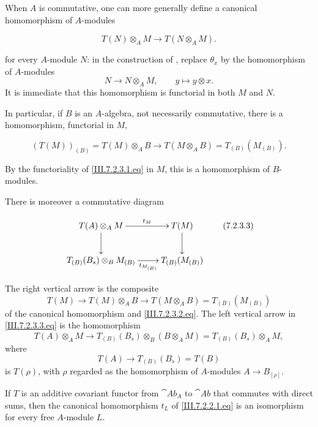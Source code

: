 \begin{env}[7.2.3]
\label{III.7.2.3}
When $A$ is commutative, one can more generally define a
canonical homomorphism of $A$-modules
\begin{env}[7.2.3.1]
\label{III.7.2.3.1}
\[
  T(N)\otimes_A M
  \longrightarrow
  T(N\otimes_A M).
  \tag{7.2.3.1}\label{III.7.2.3.1.eq}
\]
\end{env}
for every $A$-module $N$: in the construction of
, replace $\theta_x$ by the homomorphism of
$A$-modules
\[
  N\longrightarrow N\otimes_A M,
  \qquad
  y\longmapsto y\otimes x.
\]
It is immediate that this homomorphism is functorial in both
$M$ and $N$.

In particular, if $B$ is an $A$-algebra, not necessarily
commutative, there is a homomorphism, functorial in $M$,
\begin{env}[7.2.3.2]
\label{III.7.2.3.2}
\[
  (T(M))_{(B)}
  =
  T(M)\otimes_A B
  \longrightarrow
  T(M\otimes_A B)
  =
  T_{(B)}(M_{(B)}).
  \tag{7.2.3.2}\label{III.7.2.3.2.eq}
\]
\end{env}
By the functoriality of \eqref{III.7.2.3.1.eq} in $M$, this is
a homomorphism of $B$-modules.

There is moreover a commutative diagram
\begin{env}[7.2.3.3]
\label{III.7.2.3.3}
\[
\xymatrix{
  T(A)\otimes_A M
    \ar[r]^-{t_M}\ar[d]
  & T(M)\ar[d]
  \\
  T_{(B)}(B_s)\otimes_B M_{(B)}
    \ar[r]_-{t_{M_{(B)}}}
  & T_{(B)}(M_{(B)})
}
\tag{7.2.3.3}\label{III.7.2.3.3.eq}
\]
\end{env}
The right vertical arrow is the composite
\[
  T(M)
  \longrightarrow
  T(M)\otimes_A B
  \longrightarrow
  T(M\otimes_A B)
  =
  T_{(B)}(M_{(B)})
\]
of the canonical homomorphism and
\eqref{III.7.2.3.2.eq}.  The left vertical arrow in
\eqref{III.7.2.3.3.eq} is the homomorphism
\[
  T(A)\otimes_A M
  \longrightarrow
  T_{(B)}(B_s)\otimes_B(B\otimes_A M)
  =
  T_{(B)}(B_s)\otimes_A M,
\]
where
\[
  T(A)\longrightarrow T_{(B)}(B_s)=T(B)
\]
is $T(\rho)$, with $\rho$ regarded as the homomorphism of
$A$-modules $A\to B_{[\rho]}$.
\end{env}

\begin{lemma}[7.2.4]
\label{III.7.2.4}
If $T$ is an additive covariant functor from $\cat{Ab}_A$ to
$\cat{Ab}$ that commutes with direct sums, then the canonical
homomorphism $t_L$ of \eqref{III.7.2.2.1.eq} is an isomorphism
for every free $A$-module $L$.
\end{lemma}


